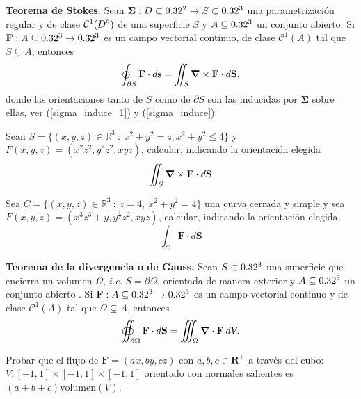 \begin{theorem}
\textbf{Teorema de Stokes.}  Sean $\boldsymbol{\Sigma}:D\subset0.32^2 \to S\subset0.32^3$    una parametrizaci\'on regular y  de clase  $\mathcal{C}^1({\kern0ptD}^{\mathrm{o}})$ de una superficie $S$ y $A \subseteq 0.32^3$ un conjunto abierto.    Si $\mathbf{F}:  A\subseteq 0.32^3\to 0.32^3$ es un campo vectorial continuo, de clase  $\mathcal{C}^1(A)$ tal que  $S \subsetneq A$, entonces
\[
    \oint_{\partial S}\mathbf{F}\cdot d\mathbf{s}=\iint_S\grad\times\mathbf{F}\cdot d\mathbf{S}, 
\]  donde las orientaciones tanto de  $S$ como de $\partial S$ son las inducidas por $\boldsymbol{\Sigma}$ sobre ellas, ver  (\ref{sigma_induce_1}) y  (\ref{sigma_induce}).
\end{theorem}

\begin{tarea} Sean  $S=\{  (x,y,z) \in \mathbb{R}^{3} \: : \:  x ^{2}+ y^{2} = z,  x ^{2}+ y^{2}  \leq 4 \}$  y $F(x,y,z) = (x ^{2}z^{2}, y^{2}z^{2}, xyz)$, calcular, indicando la orientaci\'on elegida   $$\iint_S\grad\times\mathbf{F}\cdot d\mathbf{S}$$
\end{tarea}

\begin{tarea} Sea  $C=\{  (x,y,z) \in \mathbb{R}^{3} \: : \:  z=4, \: x ^{2}+ y^{2}   = 4 \}$  una curva cerrada y simple y sea  $F(x,y,z) = (x ^{3}z^{3}+y, y^{\frac{1}{3}}z^{2}, xyz)$,  calcular,  indicando la orientaci\'on elegida,      $$\int_{C}\mathbf{F}\cdot d\mathbf{S}$$
\end{tarea}



\begin{theorem}
\textbf{Teorema de la divergencia o de Gauss.}  Sean $S\subset0.32^3$ una superficie que encierra un volumen $\Omega$, \textit{i.e.} $S=\partial \Omega$, orientada de manera exterior y $A \subseteq 0.32^3$ un conjunto abierto .  Si $\mathbf{F}:A \subseteq 0.32^3 \to0.32^3$ es  un campo vectorial continuo y de clase $\mathcal{C}^1(A)$ tal que $\Omega \subsetneq A$, entonces
\[
    \oiint_{\partial \Omega}\mathbf{F}\cdot d\mathbf{S}=\iiint_{\Omega}\grad\cdot\mathbf{F}\:dV.
\]
\end{theorem}


\begin{tarea}
 Probar que el flujo de $\mathbf{F} = (ax, by, cz)$ con $a,b,c \in \mathbf{R}^+$ a través del cubo: $V : [-1,1] \times [-1,1] \times [-1,1]$ orientado con normales salientes es $(a+b+c) \mathrm{volumen}(V)$.
\end{tarea} 


